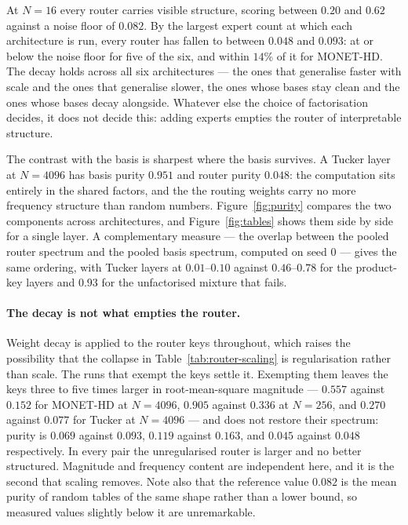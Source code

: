 At $N = 16$ every router carries visible structure, scoring between $0.20$ and
$0.62$ against a noise floor of $0.082$. By the largest expert count at which each architecture is run, every router has
fallen to between $0.048$ and $0.093$: at or below the noise floor for five of
the six, and within $14\%$ of it for MONET-HD. The decay holds across all six architectures --- the ones that generalise faster with scale and the ones
that generalise slower, the ones whose bases stay clean and the ones whose
bases decay alongside. Whatever else the choice of factorisation decides, it
does not decide this: adding experts empties the router of interpretable
structure.

The contrast with the basis is sharpest where the basis survives. A Tucker
layer at $N = 4096$ has basis purity $0.951$ and router purity $0.048$: the
computation sits entirely in the shared factors, and the the routing weights carry no more frequency structure than random numbers. Figure~\ref{fig:purity} compares
the two components across architectures, and Figure~\ref{fig:tables} shows them
side by side for a single layer. A complementary measure --- the overlap
between the pooled router spectrum and the pooled basis spectrum, computed on
seed $0$ --- gives the same ordering, with Tucker layers at $0.01$--$0.10$
against $0.46$--$0.78$ for the product-key layers and $0.93$ for the
unfactorised mixture that fails.

\paragraph{The decay is not what empties the router.} Weight decay is applied
to the router keys throughout, which raises the possibility that the collapse
in Table~\ref{tab:router-scaling} is regularisation rather than scale. The
runs that exempt the keys settle it. Exempting them leaves the keys three to
five times larger in root-mean-square magnitude --- $0.557$ against $0.152$
for MONET-HD at $N = 4096$, $0.905$ against $0.336$ at $N = 256$, and $0.270$
against $0.077$ for Tucker at $N = 4096$ --- and does not restore their
spectrum: purity is $0.069$ against $0.093$, $0.119$ against $0.163$, and
$0.045$ against $0.048$ respectively. In every pair the unregularised router
is larger and no better structured. Magnitude and frequency content are
independent here, and it is the second that scaling removes. Note also that
the reference value $0.082$ is the mean purity of random tables of the same
shape rather than a lower bound, so measured values slightly below it are
unremarkable.


